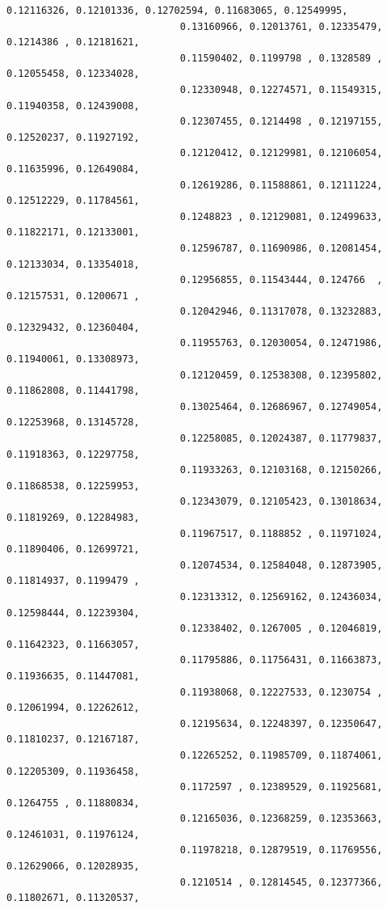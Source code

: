 \documentclass[11pt]{article}
\begin{document}
\begin{Verbatim}[commandchars=\\\{\}]
                              0.12116326, 0.12101336, 0.12702594, 0.11683065, 0.12549995,
                              0.13160966, 0.12013761, 0.12335479, 0.1214386 , 0.12181621,
                              0.11590402, 0.1199798 , 0.1328589 , 0.12055458, 0.12334028,
                              0.12330948, 0.12274571, 0.11549315, 0.11940358, 0.12439008,
                              0.12307455, 0.1214498 , 0.12197155, 0.12520237, 0.11927192,
                              0.12120412, 0.12129981, 0.12106054, 0.11635996, 0.12649084,
                              0.12619286, 0.11588861, 0.12111224, 0.12512229, 0.11784561,
                              0.1248823 , 0.12129081, 0.12499633, 0.11822171, 0.12133001,
                              0.12596787, 0.11690986, 0.12081454, 0.12133034, 0.13354018,
                              0.12956855, 0.11543444, 0.124766  , 0.12157531, 0.1200671 ,
                              0.12042946, 0.11317078, 0.13232883, 0.12329432, 0.12360404,
                              0.11955763, 0.12030054, 0.12471986, 0.11940061, 0.13308973,
                              0.12120459, 0.12538308, 0.12395802, 0.11862808, 0.11441798,
                              0.13025464, 0.12686967, 0.12749054, 0.12253968, 0.13145728,
                              0.12258085, 0.12024387, 0.11779837, 0.11918363, 0.12297758,
                              0.11933263, 0.12103168, 0.12150266, 0.11868538, 0.12259953,
                              0.12343079, 0.12105423, 0.13018634, 0.11819269, 0.12284983,
                              0.11967517, 0.1188852 , 0.11971024, 0.11890406, 0.12699721,
                              0.12074534, 0.12584048, 0.12873905, 0.11814937, 0.1199479 ,
                              0.12313312, 0.12569162, 0.12436034, 0.12598444, 0.12239304,
                              0.12338402, 0.1267005 , 0.12046819, 0.11642323, 0.11663057,
                              0.11795886, 0.11756431, 0.11663873, 0.11936635, 0.11447081,
                              0.11938068, 0.12227533, 0.1230754 , 0.12061994, 0.12262612,
                              0.12195634, 0.12248397, 0.12350647, 0.11810237, 0.12167187,
                              0.12265252, 0.11985709, 0.11874061, 0.12205309, 0.11936458,
                              0.1172597 , 0.12389529, 0.11925681, 0.1264755 , 0.11880834,
                              0.12165036, 0.12368259, 0.12353663, 0.12461031, 0.11976124,
                              0.11978218, 0.12879519, 0.11769556, 0.12629066, 0.12028935,
                              0.1210514 , 0.12814545, 0.12377366, 0.11802671, 0.11320537,

\end{Verbatim}
\end{document}
